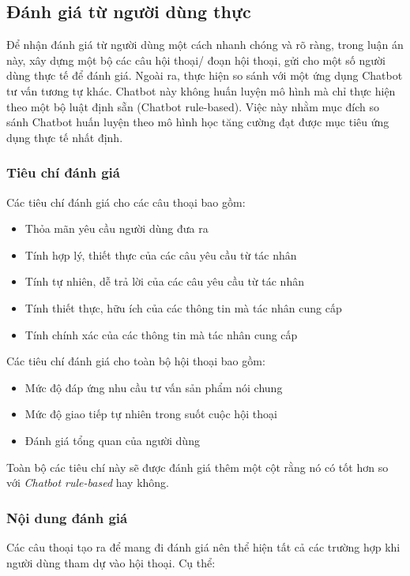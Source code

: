 \subsection{Đánh giá từ người dùng thực}
Để nhận đánh giá từ người dùng một cách nhanh chóng và rõ ràng, trong luận án này, xây dựng một bộ các câu hội thoại/ đoạn hội thoại, gửi cho một số người dùng thực tế để đánh giá. Ngoài ra, thực hiện so sánh với một ứng dụng Chatbot tư vấn tương tự khác. Chatbot này không huấn luyện mô hình mà chỉ thực hiện theo một bộ luật định sẵn (Chatbot rule-based). Việc này nhằm mục đích so sánh Chatbot huấn luyện theo mô hình học tăng cường đạt được mục tiêu ứng dụng thực tế nhất định.

\subsubsection{Tiêu chí đánh giá}
Các tiêu chí đánh giá cho các câu thoại bao gồm:

\begin{itemize}
    \item Thỏa mãn yêu cầu người dùng đưa ra
    \item Tính hợp lý, thiết thực của các câu yêu cầu từ tác nhân
    \item Tính tự nhiên, dễ trả lời của các câu yêu cầu từ tác nhân
    \item Tính thiết thực, hữu ích của các thông tin mà tác nhân cung cấp
    \item Tính chính xác của các thông tin mà tác nhân cung cấp
\end{itemize}

Các tiêu chí đánh giá cho toàn bộ hội thoại bao gồm:

\begin{itemize}
    \item Mức độ đáp ứng nhu cầu tư vấn sản phẩm nói chung
    \item Mức độ giao tiếp tự nhiên trong suốt cuộc hội thoại
    \item Đánh giá tổng quan của người dùng
\end{itemize}

Toàn bộ các tiêu chí này sẽ được đánh giá thêm một cột rằng nó có tốt hơn so với \textit{Chatbot rule-based} hay không.

\subsubsection{Nội dung đánh giá}
Các câu thoại tạo ra để mang đi đánh giá nên thể hiện tất cả các trường hợp khi người dùng tham dự vào hội thoại. Cụ thể:


